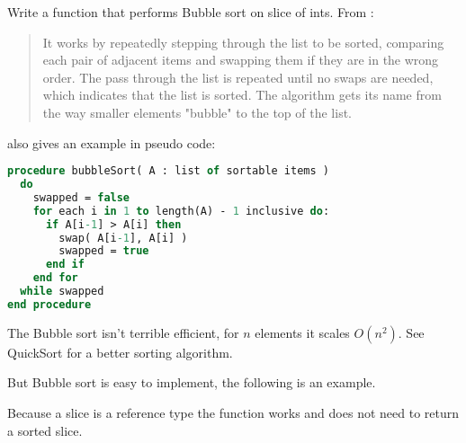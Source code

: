 \begin{Exercise}[title={Bubble sort},difficulty=5]
\label{ex:bubble}
\Question\label{ex:bubble q1} Write a function that performs 
Bubble sort on slice of ints. From \cite{bubblesort}:
\begin{quote}
It works by repeatedly stepping through the list to be sorted, comparing each
pair of adjacent items and swapping them if they are in the wrong order. The
pass through the list is repeated until no swaps are needed, which indicates
that the list is sorted. The algorithm gets its name from the way smaller
elements "bubble" to the top of the list. 
\end{quote}

\cite{bubblesort} also gives an example in pseudo code:
\begin{lstlisting}[language=pascal]
procedure bubbleSort( A : list of sortable items )
  do
    swapped = false
    for each i in 1 to length(A) - 1 inclusive do:
      if A[i-1] > A[i] then
        swap( A[i-1], A[i] )
        swapped = true
      end if
    end for
  while swapped
end procedure
\end{lstlisting}
\end{Exercise}

\begin{Answer}
\Question 
The Bubble sort isn't terrible efficient, for $n$ elements it scales
$O(n^2)$. See QuickSort \cite{quicksort} for a better sorting algorithm.

But Bubble sort is easy to implement, the following is an example.


Because a slice is a reference type the  function works and
does not need to return a sorted slice.
\end{Answer}
